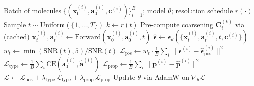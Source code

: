 \documentclass[12pt,a4paper]{article}
\newcommand{\SNR}{\mathrm{SNR}}
\newcommand{\bx}{\bm{x}}
\newcommand{\bep}{\bm{\epsilon}}
\newcommand{\cL}{\mathcal{L}}
\begin{document}
\begin{algorithm}[H]
\caption{MolSSD Training Step}\label{alg:training}
\begin{algorithmic}[1]
\Require Batch of molecules $\{(\bx_0^{(i)}, \bm{a}_0^{(i)}, \bm{c}^{(i)})\}_{i=1}^B$; model $\theta$; resolution schedule $r(\cdot)$
\State Sample $t \sim \text{Uniform}(\{1, \ldots, T\})$
\State $k \gets r(t)$
    \State Pre-compute coarsening $\bm{C}^{(k)}_i$ via  (cached)
    \State $\bx_t^{(i)}, \bm{a}_t^{(i)} \gets \text{Forward}(\bx_0^{(i)}, \bm{a}_0^{(i)}, t)$ 
\EndFor
\State $\hat{\bep} \gets \bep_\theta(\{\bx_t^{(i)}, \bm{a}_t^{(i)}, t, \bm{c}^{(i)}\})$ 
\State {}
\State $w_t \gets \min\!\left(\SNR(t), 5\right) / \SNR(t)$ 
\State $\cL_{\text{pos}} \gets w_t \cdot \frac{1}{B} \sum_i \|\bep^{(i)} - \hat{\bep}^{(i)}_{\text{pos}}\|^2$ 
\State $\cL_{\text{type}} \gets \frac{1}{B} \sum_i \text{CE}(\bm{a}_0^{(i)}, \hat{\bm{a}}^{(i)})$ 
\State $\cL_{\text{prop}} \gets \frac{1}{B} \sum_i \|\bm{p}^{(i)} - \hat{\bm{p}}^{(i)}\|^2$ 
\State $\cL \gets \cL_{\text{pos}} + \lambda_{\text{type}}\, \cL_{\text{type}} + \lambda_{\text{prop}}\, \cL_{\text{prop}}$
\State Update $\theta$ via AdamW on $\nabla_\theta \cL$
\end{algorithmic}
\end{algorithm}
\end{document}
